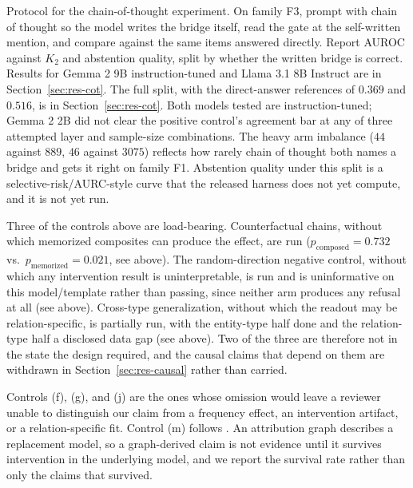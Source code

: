 \documentclass{article}
\newif\ifredflags
\newcommand{\rf}[1]{\ifredflags{\textcolor{red}{\textbf{[MISSING: #1]}}}\fi}
\begin{document}
Protocol for the chain-of-thought experiment. On family F3, prompt with chain of thought so the model
writes the bridge itself, read the
gate at the self-written mention, and compare against the same items answered directly. Report AUROC
against $K_2$ and abstention quality, split by whether the written bridge is correct. Results for
Gemma 2 9B instruction-tuned and Llama 3.1 8B Instruct are in Section~\ref{sec:res-cot}. The full split, with the
direct-answer references of $0.369$ and $0.516$, is in Section~\ref{sec:res-cot}.
\rf{a paired test on the correct-versus-wrong contrast with bootstrap intervals on each arm. Until it
exists this reports a direction, not a result, and cannot be cited against
\citet{cheng2025cotobscures}.} Both models
tested are instruction-tuned; Gemma 2 2B did not clear the positive control's agreement bar at any of
three attempted layer and sample-size combinations. The heavy arm imbalance ($44$ against $889$, $46$
against $3075$) reflects how rarely chain of thought both names a bridge and gets it right on family
F1. Abstention quality under this split is a selective-risk/AURC-style curve that the released harness
does not yet compute, and it is not yet run.

Three of the controls above are load-bearing. Counterfactual chains, without which memorized
composites can produce the effect, are run ($p_{\mathrm{composed}}=0.732$ vs.\ $p_{\mathrm{memorized}}=0.021$,
see above). The
random-direction negative control, without which any intervention result is uninterpretable, is run
and is uninformative on this model/template rather than passing, since neither arm produces any
refusal at all (see above). Cross-type generalization, without which the readout may be
relation-specific, is partially run, with the entity-type half done and the relation-type half a
disclosed data gap (see above). Two of the three are therefore not in the state the design required,
and the causal claims that depend on them are withdrawn in Section~\ref{sec:res-causal} rather than
carried.

Controls (f), (g), and (j) are the ones whose omission would leave a reviewer unable to distinguish
our claim from a frequency effect, an intervention artifact, or a relation-specific fit. Control (m)
follows \citet{lindsey2025biology}. An attribution graph describes a replacement model, so a
graph-derived claim is not evidence until it survives intervention in the underlying model, and we
report the survival rate rather than only the claims that survived.
\end{document}
